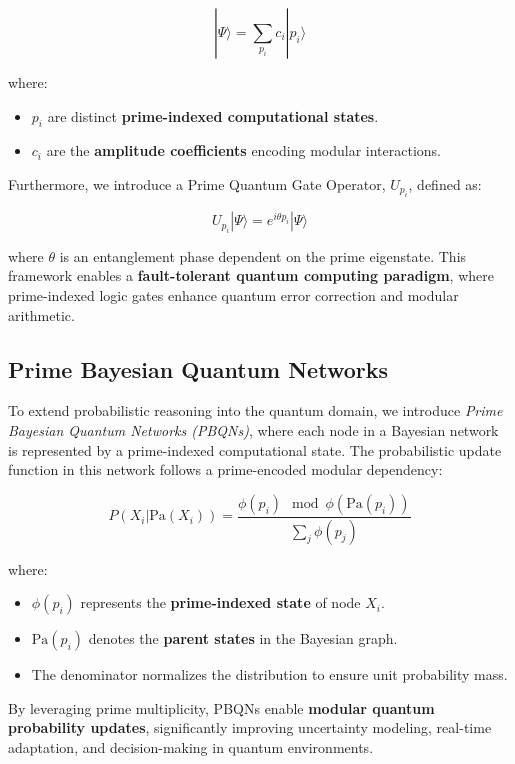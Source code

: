 \documentclass{article}
\theoremstyle{plain}
\theoremstyle{plain}
\theoremstyle{definition}
\theoremstyle{remark}
\begin{document}
\begin{equation}
|\Psi\rangle = \sum_{p_i} c_i |p_i\rangle
\end{equation}

where:
\begin{itemize}
    \item $p_i$ are distinct \textbf{prime-indexed computational states}.
    \item $c_i$ are the \textbf{amplitude coefficients} encoding modular interactions.
\end{itemize}

Furthermore, we introduce a Prime Quantum Gate Operator, $U_{p_i}$, defined as:

\begin{equation}
U_{p_i} |\Psi\rangle = e^{i \theta p_i} |\Psi\rangle
\end{equation}

where $\theta$ is an entanglement phase dependent on the prime eigenstate. This framework enables a \textbf{fault-tolerant quantum computing paradigm}, where prime-indexed logic gates enhance quantum error correction and modular arithmetic.

\subsection{Prime Bayesian Quantum Networks}

To extend probabilistic reasoning into the quantum domain, we introduce \textit{Prime Bayesian Quantum Networks (PBQNs)}, where each node in a Bayesian network is represented by a prime-indexed computational state. The probabilistic update function in this network follows a prime-encoded modular dependency:

\begin{equation}
P(X_i | \text{Pa}(X_i)) = \frac{\phi(p_i) \mod \phi(\text{Pa}(p_i))}{\sum_{j} \phi(p_j)}
\end{equation}

where:
\begin{itemize}
    \item $\phi(p_i)$ represents the \textbf{prime-indexed state} of node $X_i$.
    \item $\text{Pa}(p_i)$ denotes the \textbf{parent states} in the Bayesian graph.
    \item The denominator normalizes the distribution to ensure unit probability mass.
\end{itemize}

By leveraging prime multiplicity, PBQNs enable \textbf{modular quantum probability updates}, significantly improving uncertainty modeling, real-time adaptation, and decision-making in quantum environments.
\end{document}
